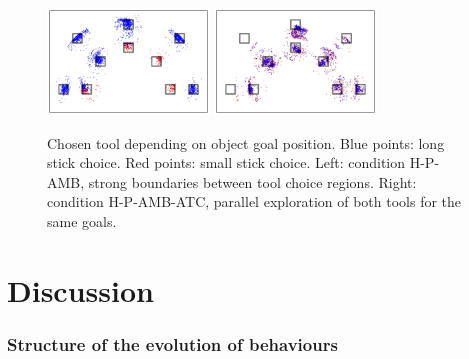 \documentclass[10pt,letterpaper]{article}
\begin{document}
		\begin{figure}[ht]
			\centering
			\includegraphics[width=4.3cm]{./include/choice-H-RGB-P-AMB.pdf}
			\hspace{-0.2cm}
			\includegraphics[width=4.3cm]{./include/choice-H-RGB-P-AMB-PGITC.pdf}
			\caption{Chosen tool depending on object goal position. Blue points: long stick choice. Red points: small stick choice. Left: condition H-P-AMB, strong boundaries 
			between tool choice regions. Right: condition H-P-AMB-ATC, parallel exploration of both tools for the same goals.}
			\label{res_choice}
		\end{figure}
		
	
%


\section{Discussion}

	\subsubsection{Structure of the evolution of behaviours}
	
\end{document}
